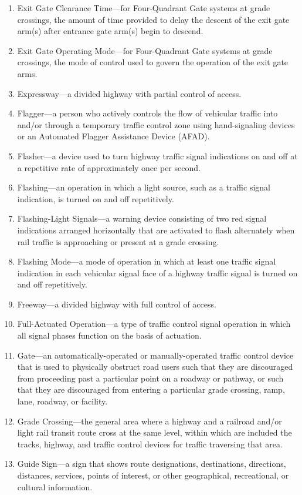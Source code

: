 \documentclass[9pt]{memoir}
\begin{document}
{\begin{enumerate}[label=\arabic*., ref=\arabic*]
\item Exit Gate Clearance Time---for Four-Quadrant Gate systems at grade crossings, the amount of time provided to delay the descent of the exit gate arm(s) after entrance gate arm(s) begin to descend.
\item Exit Gate Operating Mode---for Four-Quadrant Gate systems at grade crossings, the mode of control used to govern the operation of the exit gate arms.
\item Expressway---a divided highway with partial control of access.
\item Flagger---a person who actively controls the flow of vehicular traffic into and/or through a temporary traffic control zone using hand-signaling devices or an Automated Flagger Assistance Device (AFAD).
\item Flasher---a device used to turn highway traffic signal indications on and off at a repetitive rate of approximately once per second.
\item Flashing---an operation in which a light source, such as a traffic signal indication, is turned on and off repetitively.
\item Flashing-Light Signals---a warning device consisting of two red signal indications arranged horizontally that are activated to flash alternately when rail traffic is approaching or present at a grade crossing.
\item Flashing Mode---a mode of operation in which at least one traffic signal indication in each vehicular signal face of a highway traffic signal is turned on and off repetitively.
\item Freeway---a divided highway with full control of access.
\item Full-Actuated Operation---a type of traffic control signal operation in which all signal phases function on the basis of actuation.
\item Gate---an automatically-operated or manually-operated traffic control device that is used to physically obstruct road users such that they are discouraged from proceeding past a particular point on a roadway or pathway, or such that they are discouraged from entering a particular grade crossing, ramp, lane, roadway, or facility.
\item Grade Crossing---the general area where a highway and a railroad and/or light rail transit route cross at the same level, within which are included the tracks, highway, and traffic control devices for traffic traversing that area.
\item Guide Sign---a sign that shows route designations, destinations, directions, distances, services, points of interest, or other geographical, recreational, or cultural information.

\end{enumerate}}
\end{document}
